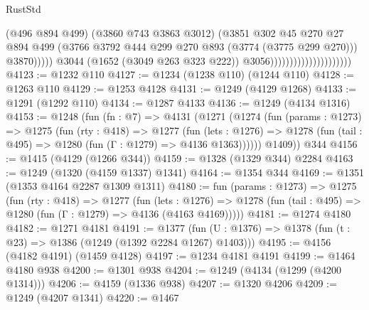 \begin{lexlean}{RustStd}
\begin{coremodule}
                                                      (@496 @894 @499)
                                                      (@3860 @743 @3863 @3012)
                                                      (@3851
                                                        @302
                                                        @45
                                                        @270
                                                        @27
                                                        @894
                                                        @499
                                                        (@3766
                                                          @3792
                                                          @444
                                                          @299
                                                          @270
                                                          @893
                                                          (@3774 (@3775 @299 @270)))
                                                        @3870)))))
                                              @3044
                                              (@1652 (@3049 @263 @323 @222))
                                              @3056)))))))))))))))))))))
@4123 := @1232 @110
@4127 := @1234 (@1238 @110) (@1244 @110)
@4128 := @1263 @110
@4129 := @1253 @4128
@4131 := @1249 (@4129 @1268)
@4133 := @1291 (@1292 @110)
@4134 := @1287 @4133
@4136 := @1249 (@4134 @1316)
@4153 := @1248
    (fun (fn : @7) =>
    @4131
      (@1271
        (@1274
          (fun (params : @1273) =>
          @1275
            (fun (rty : @418) =>
            @1277
              (fun (lets : @1276) =>
              @1278 (fun (tail : @495) => @1280 (fun (Γ : @1279) => @4136 @1363))))))
        @1409))
    @344
@4156 := @1415 (@4129 (@1266 @344))
@4159 := @1328 (@1329 @344) @2284
@4163 := @1249 (@1320 (@4159 @1337) @1341)
@4164 := @1354 @344
@4169 := @1351 (@1353 @4164 @2287 @1309 @1311)
@4180 := fun (params : @1273) =>
  @1275
    (fun (rty : @418) =>
    @1277
      (fun (lets : @1276) =>
      @1278 (fun (tail : @495) => @1280 (fun (Γ : @1279) => @4136 (@4163 @4169)))))
@4181 := @1274 @4180
@4182 := @1271 @4181
@4191 := @1377 (fun (U : @1376) => @1378 (fun (t : @23) => @1386 (@1249 (@1392 @2284 @1267) @1403)))
@4195 := @4156 (@4182 @4191) (@1459 @4128)
@4197 := @1234 @4181 @4191
@4199 := @1464 @4180 @938
@4200 := @1301 @938
@4204 := @1249 (@4134 (@1299 (@4200 @1314)))
@4206 := @4159 (@1336 @938)
@4207 := @1320 @4206
@4209 := @1249 (@4207 @1341)
@4220 := @1467

\end{coremodule}
\end{lexlean}
